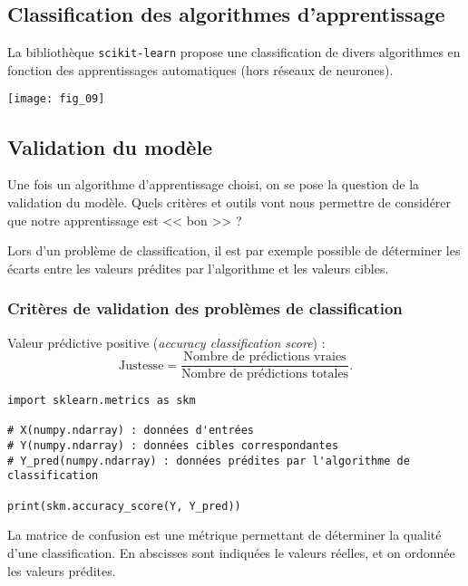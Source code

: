 \subsection{Classification des algorithmes d'apprentissage}

La bibliothèque \texttt{scikit-learn} propose une classification de divers algorithmes en fonction des apprentissages automatiques (hors réseaux de neurones).


\begin{center}
\texttt{[image: fig\_09]}
\end{center}


\subsection{Validation du modèle}
Une fois un algorithme d'apprentissage choisi, on se pose la question de la validation du modèle. Quels critères et outils vont nous permettre de considérer que notre apprentissage est << bon >> ?

Lors d'un problème de classification, il est par exemple possible de déterminer les écarts entre les valeurs prédites par l'algorithme et les valeurs cibles.

\subsubsection{Critères de validation des problèmes de classification}



\begin{defi}
Valeur prédictive positive (\textit{accuracy classification score}) :
$$
\text{Justesse} = \dfrac{\text{Nombre de prédictions vraies}}{\text{Nombre de prédictions totales}}.
$$
\end{defi}

\begin{lstlisting}
import sklearn.metrics as skm

# X(numpy.ndarray) : données d'entrées
# Y(numpy.ndarray) : données cibles correspondantes
# Y_pred(numpy.ndarray) : données prédites par l'algorithme de classification

print(skm.accuracy_score(Y, Y_pred))
\end{lstlisting}



\begin{defi}
La matrice de confusion est une métrique permettant de déterminer la qualité d'une classification. En abscisses sont indiquées le valeurs réelles, et on ordonnée les valeurs prédites. 
\end{defi}


